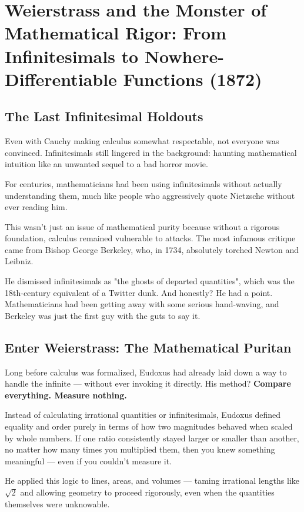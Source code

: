 \section{Weierstrass and the Monster of Mathematical Rigor: From Infinitesimals to Nowhere-Differentiable Functions (1872) }  

\subsection{The Last Infinitesimal Holdouts}  

Even with Cauchy making calculus somewhat respectable, not everyone was convinced. Infinitesimals still lingered in the background: haunting mathematical intuition like an unwanted sequel to a bad horror movie.  

For centuries, mathematicians had been using infinitesimals without actually understanding them, much like people who aggressively quote Nietzsche without ever reading him.  

This wasn’t just an issue of mathematical purity because without a rigorous foundation, calculus remained vulnerable to attacks. The most infamous critique came from Bishop George Berkeley, who, in 1734, absolutely torched Newton and Leibniz.  

He dismissed infinitesimals as "the ghosts of departed quantities", which was the 18th-century equivalent of a Twitter dunk. And honestly? He had a point. Mathematicians had been getting away with some serious hand-waving, and Berkeley was just the first guy with the guts to say it.  

\subsection{Enter Weierstrass: The Mathematical Puritan}  

Long before calculus was formalized, Eudoxus had already laid down a way to handle the infinite — without ever invoking it directly. His method?  
\textbf{Compare everything. Measure nothing.}  

Instead of calculating irrational quantities or infinitesimals, Eudoxus defined equality and order purely in terms of how two magnitudes behaved when scaled by whole numbers. If one ratio consistently stayed larger or smaller than another, no matter how many times you multiplied them, then you knew something meaningful — even if you couldn’t measure it.

He applied this logic to lines, areas, and volumes — taming irrational lengths like \( \sqrt{2} \) and allowing geometry to proceed rigorously, even when the quantities themselves were unknowable.  


